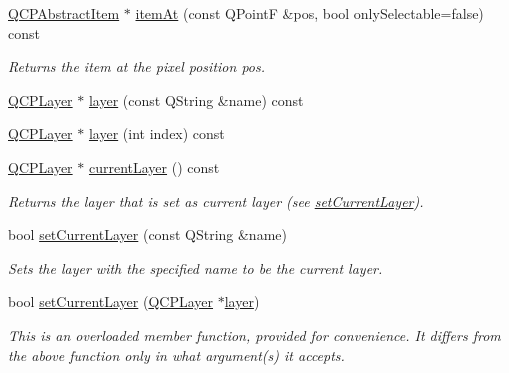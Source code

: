 \begin{DoxyCompactItemize}
\item 
\hyperlink{a00022}{Q\+C\+P\+Abstract\+Item} $\ast$ \hyperlink{a00116_a793e4b04e0ede11a733021907368fa83}{item\+At} (const Q\+Point\+F \&pos, bool only\+Selectable=false) const 
\begin{DoxyCompactList}\small\item\em Returns the item at the pixel position {\itshape pos}. \end{DoxyCompactList}\item 
\hyperlink{a00043}{Q\+C\+P\+Layer} $\ast$ \hyperlink{a00116_ae576ada60c1133318e29348d43d3cf10}{layer} (const Q\+String \&name) const 
\item 
\hyperlink{a00043}{Q\+C\+P\+Layer} $\ast$ \hyperlink{a00116_a1b7efcbaf6ed6181f1a28f3d486f8837}{layer} (int index) const 
\item 
\hyperlink{a00043}{Q\+C\+P\+Layer} $\ast$ \hyperlink{a00116_af73057345656cbd1463454982d808b00}{current\+Layer} () const 
\begin{DoxyCompactList}\small\item\em Returns the layer that is set as current layer (see \hyperlink{a00116_a23a4d3cadad1a0063c5fe19aac5659e6}{set\+Current\+Layer}). \end{DoxyCompactList}\item 
bool \hyperlink{a00116_a73a6dc47c653bb6f8f030abca5a11852}{set\+Current\+Layer} (const Q\+String \&name)
\begin{DoxyCompactList}\small\item\em Sets the layer with the specified {\itshape name} to be the current layer. \end{DoxyCompactList}\item 
bool \hyperlink{a00116_a23a4d3cadad1a0063c5fe19aac5659e6}{set\+Current\+Layer} (\hyperlink{a00043}{Q\+C\+P\+Layer} $\ast$\hyperlink{a00116_a1b7efcbaf6ed6181f1a28f3d486f8837}{layer})
\begin{DoxyCompactList}\small\item\em This is an overloaded member function, provided for convenience. It differs from the above function only in what argument(s) it accepts.


\end{DoxyCompactList}
\end{DoxyCompactItemize}
